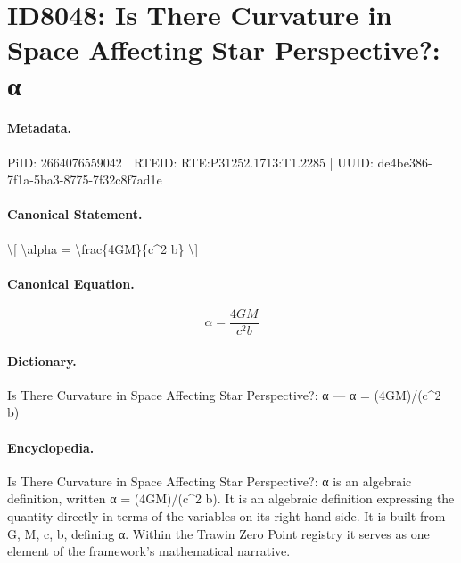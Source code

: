\section*{ID8048: Is There Curvature in Space Affecting Star Perspective?: α}
\paragraph{Metadata.}
PiID: 2664076559042 | RTEID: RTE:P31252.1713:T1.2285 | UUID: de4be386-7f1a-5ba3-8775-7f32c8f7ad1e

\paragraph{Canonical Statement.}
\textbackslash{}[ \textbackslash{}alpha = \textbackslash{}frac\{4GM\}\{c\textasciicircum{}2 b\} \textbackslash{}]

\paragraph{Canonical Equation.}
\[
\alpha = \frac{4GM}{c^2 b}
\]

\paragraph{Dictionary.}
Is There Curvature in Space Affecting Star Perspective?: α — α = (4GM)/(c\textasciicircum{}2 b)

\paragraph{Encyclopedia.}
Is There Curvature in Space Affecting Star Perspective?: α is an algebraic definition, written α = (4GM)/(c\textasciicircum{}2 b). It is an algebraic definition expressing the quantity directly in terms of the variables on its right-hand side. It is built from G, M, c, b, defining α. Within the Trawin Zero Point registry it serves as one element of the framework's mathematical narrative.
